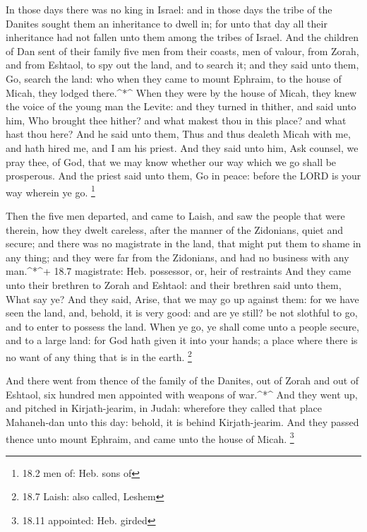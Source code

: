  In those days there was no king in Israel: and in those
days the tribe of the Danites sought them an inheritance to dwell in;
for unto that day all their inheritance had not fallen unto them among
the tribes of Israel.  And the children of Dan sent of their
family five men from their coasts, men of valour, from Zorah, and from
Eshtaol, to spy out the land, and to search it; and they said unto them,
Go, search the land: who when they came to mount Ephraim, to the house
of Micah, they lodged there.\^{}*\^{}  When they were by the
house of Micah, they knew the voice of the young man the Levite: and
they turned in thither, and said unto him, Who brought thee hither? and
what makest thou in this place? and what hast thou here? 
And he said unto them, Thus and thus dealeth Micah with me, and hath
hired me, and I am his priest.  And they said unto him, Ask
counsel, we pray thee, of God, that we may know whether our way which we
go shall be prosperous.  And the priest said unto them, Go
in peace: before the LORD is your way wherein ye go. \footnote{18.2 men
  of: Heb. sons of}

 Then the five men departed, and came to Laish, and saw the
people that were therein, how they dwelt careless, after the manner of
the Zidonians, quiet and secure; and there was no magistrate in the
land, that might put them to shame in any thing; and they were far from
the Zidonians, and had no business with any man.\^{}*\^{}+ 18.7
magistrate: Heb. possessor, or, heir of restraints  And they
came unto their brethren to Zorah and Eshtaol: and their brethren said
unto them, What say ye?  And they said, Arise, that we may
go up against them: for we have seen the land, and, behold, it is very
good: and are ye still? be not slothful to go, and to enter to possess
the land.  When ye go, ye shall come unto a people secure,
and to a large land: for God hath given it into your hands; a place
where there is no want of any thing that is in the earth. \footnote{18.7
  Laish: also called, Leshem}

 And there went from thence of the family of the Danites,
out of Zorah and out of Eshtaol, six hundred men appointed with weapons
of war.\^{}*\^{}  And they went up, and pitched in
Kirjath-jearim, in Judah: wherefore they called that place Mahaneh-dan
unto this day: behold, it is behind Kirjath-jearim.  And
they passed thence unto mount Ephraim, and came unto the house of Micah.
\footnote{18.11 appointed: Heb. girded}

